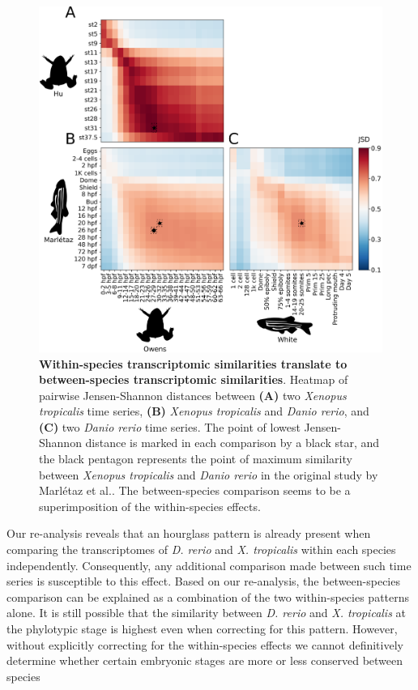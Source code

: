 \begin{figure}[H]
    \includegraphics[width=\linewidth]{ch.hourglass/images/between_experiment.png}
    \caption{\textbf{Within-species transcriptomic similarities translate to between-species transcriptomic similarities}. Heatmap of pairwise Jensen-Shannon distances between \textbf{(A)} two \textit{Xenopus tropicalis} time series, \textbf{(B)} \textit{Xenopus tropicalis} and \textit{Danio rerio}, and \textbf{(C)} two \textit{Danio rerio} time series. The point of lowest Jensen-Shannon distance is marked in each comparison by a black star, and the black pentagon represents the point of maximum similarity between \textit{Xenopus tropicalis} and \textit{Danio rerio} in the original study by Marl\'etaz et al.\cite{marletaz2018}. The between-species comparison seems to be a superimposition of the within-species effects.}
    \label{fig:betweenexperiment}
\end{figure}

Our re-analysis reveals that an hourglass pattern is already present when comparing the transcriptomes of \textit{D. rerio} and \textit{X. tropicalis} within each species independently. Consequently, any additional comparison made between such time series is susceptible to this effect. Based on our re-analysis, the between-species comparison can be explained as a combination of the two within-species patterns alone. It is still possible that the similarity between \textit{D. rerio} and \textit{X. tropicalis} at the phylotypic stage is highest even when correcting for this pattern. However, without explicitly correcting for the within-species effects we cannot definitively determine whether certain embryonic stages are more or less conserved between species

